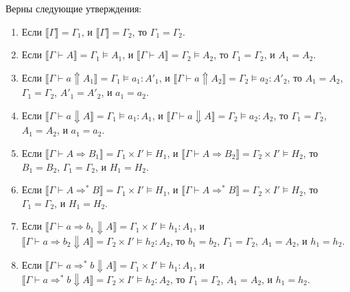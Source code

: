 \documentclass{amsart}
\theoremstyle{definition}
\theoremstyle{remark}
\newcommand{\red}{\Rightarrow}
\renewcommand{\ll}{\llbracket}
\newcommand{\rr}{\rrbracket}
\numberwithin{figure}{section}
\begin{document}
\begin{lem}
Верны следующие утверждения:
\begin{enumerate}
\item Если $\ll \Gamma \rr = \Gamma_1$, и $\ll \Gamma \rr = \Gamma_2$, то $\Gamma_1 = \Gamma_2$.
\item Если $\ll \Gamma \vdash A \rr = \Gamma_1 \models A_1$, и $\ll \Gamma \vdash A \rr = \Gamma_2 \models A_2$, то $\Gamma_1 = \Gamma_2$, и $A_1 = A_2$.
\item Если $\ll \Gamma \vdash a \Uparrow A_1 \rr = \Gamma_1 \models a_1 : A'_1$, и $\ll \Gamma \vdash a \Uparrow A_2 \rr = \Gamma_2 \models a_2 : A'_2$, то $A_1 = A_2$, $\Gamma_1 = \Gamma_2$, $A'_1 = A'_2$, и $a_1 = a_2$.
\item Если $\ll \Gamma \vdash a \Downarrow A \rr = \Gamma_1 \models a_1 : A_1$, и $\ll \Gamma \vdash a \Downarrow A \rr = \Gamma_2 \models a_2 : A_2$, то $\Gamma_1 = \Gamma_2$, $A_1 = A_2$, и $a_1 = a_2$.
\item Если $\ll \Gamma \vdash A \red B_1 \rr = \Gamma_1 \times I' \models H_1$, и $\ll \Gamma \vdash A \red B_2 \rr = \Gamma_2 \times I' \models H_2$, то $B_1 = B_2$, $\Gamma_1 = \Gamma_2$, и $H_1 = H_2$.
\item Если $\ll \Gamma \vdash A \red^* B \rr = \Gamma_1 \times I' \models H_1$, и $\ll \Gamma \vdash A \red^* B \rr = \Gamma_2 \times I' \models H_2$, то $\Gamma_1 = \Gamma_2$, и $H_1 = H_2$.
\item Если $\ll \Gamma \vdash a \red b_1 \Downarrow A \rr = \Gamma_1 \times I' \models h_1 : A_1$, и $\ll \Gamma \vdash a \red b_2 \Downarrow A \rr = \Gamma_2 \times I' \models h_2 : A_2$, то $b_1 = b_2$, $\Gamma_1 = \Gamma_2$, $A_1 = A_2$, и $h_1 = h_2$.
\item Если $\ll \Gamma \vdash a \red^* b \Downarrow A \rr = \Gamma_1 \times I' \models h_1 : A_1$, и $\ll \Gamma \vdash a \red^* b \Downarrow A \rr = \Gamma_2 \times I' \models h_2 : A_2$, то $\Gamma_1 = \Gamma_2$, $A_1 = A_2$, и $h_1 = h_2$.
\end{enumerate}
\end{lem}
\end{document}
